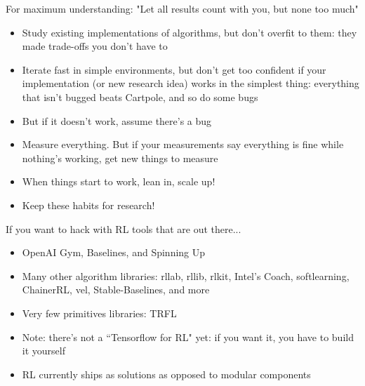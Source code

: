 \documentclass[9pt]{beamer}
\begin{document}
\begin{frame}{For maximum understanding: "Let all results count with you, but none too much"}

\begin{itemize}
\item Study existing implementations of algorithms, but don't overfit to them: they made trade-offs you don't have to
\item Iterate fast in simple environments, but don't get too confident if your implementation (or new research idea) works in the simplest thing: everything that isn't bugged beats Cartpole, and so do some bugs
\item But if it doesn't work, assume there's a bug
\item Measure everything. But if your measurements say everything is fine while nothing's working, get new things to measure
\item When things start to work, lean in, scale up!
\item Keep these habits for research!
\end{itemize}

\end{frame}

\begin{frame}{If you want to hack with RL tools that are out there...}

\begin{itemize}
\item OpenAI Gym, Baselines, and Spinning Up
\item Many other algorithm libraries: rllab, rllib, rlkit, Intel's Coach, softlearning, ChainerRL, vel, Stable-Baselines, and more
\item Very few primitives libraries: TRFL
\item Note: there's not a ``Tensorflow for RL" yet: if you want it, you have to build it yourself
\item RL currently ships as solutions as opposed to modular components
\end{itemize}

\end{frame}
\end{document}
